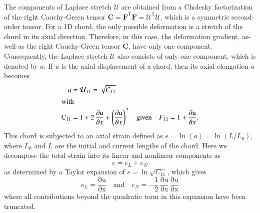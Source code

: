 The components of Laplace stretch $\boldsymbol{\mathcal{U}}$ are obtained from a Cholesky factorization of the right Cauchy-Green tensor $\mathbf{C} = \mathbf{F}^{\mathsf{T}} \mathbf{F} = \boldsymbol{\mathcal{U}}^{\mathsf{T}} \boldsymbol{\mathcal{U}}$, \cite{Srinivasa12} which is a symmetric second-order tensor. For a 1D chord, the only possible deformation is a stretch of the chord in its axial direction. Therefore, in this case, the deformation gradient, as-well-as the right Cauchy-Green tensor $\mathbf{C}$, have only one component.  Consequently, the Laplace stretch $\boldsymbol{\mathcal{U}}$ also consists of only one component, which is denoted by $a$. If $u$ is the axial displacement of a chord, then its axial elongation $a$ becomes
\begin{subequations}
    \begin{align}
    a & = {\mathcal{U}}_{11} = \sqrt{C_{11}} \\
    \intertext{with} 
    \mathrm{C_{11}} & = 1 + 2 \, \frac{\mathrm{\partial u}}{\partial x} + \left(\frac{\mathrm{\partial u}}{\partial x}\right)^2 
    \quad \text{given} \quad 
    F_{11} = 1 + \frac{\mathrm{\partial u}}{\partial x} .
    \end{align}
\end{subequations} 
This chord is subjected to an axial strain defined as $e = \ln ( a ) = \ln ( L / L_0 )$, where $L_0$ and $L$ are the initial and current lengths of the chord.  Here we decompose the total strain into its linear and nonlinear components as
\begin{equation}
e = e_{L} + e_{N}
\end{equation} 
as determined by a Taylor expansion of $e = \ln \sqrt{C_{11}}$, which gives
\begin{equation}
    e_{L} = \mathrm{\frac{\partial u}{\partial x}} 
    \quad \text{and} \quad
    e_{N} = -\frac{1}{2} \, \mathrm{\frac{\partial u}{\partial x}}\, \mathrm{\frac{\partial u}{\partial x}} 
\end{equation}
where all contributions beyond the quadratic term in this expansion have been truncated.

